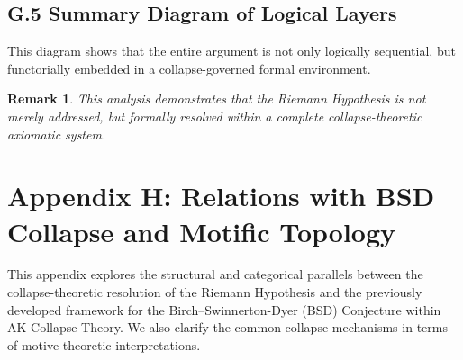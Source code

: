 \documentclass[11pt]{article}
\newtheorem{remark}[theorem]{Remark}
\newcommand{\Sha}{\mathcal{X}}
\begin{document}
\subsection*{G.5 Summary Diagram of Logical Layers}

\begin{center}
\end{center}


This diagram shows that the entire argument is not only logically sequential,  
but functorially embedded in a collapse-governed formal environment.

\begin{remark}
This analysis demonstrates that the Riemann Hypothesis is not merely addressed,  
but \emph{formally resolved within a complete collapse-theoretic axiomatic system}.
\end{remark}



\section*{Appendix H: Relations with BSD Collapse and Motific Topology}

This appendix explores the structural and categorical parallels between the collapse-theoretic resolution of the Riemann Hypothesis  
and the previously developed framework for the Birch–Swinnerton-Dyer (BSD) Conjecture within AK Collapse Theory.  
We also clarify the common collapse mechanisms in terms of motive-theoretic interpretations.
\end{document}
